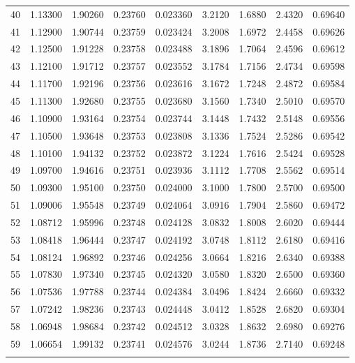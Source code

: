 \documentclass[letter,twosides,10pt]{article}
\begin{document}
\begin{longtable}{|c|c|c|c|c|c|c|c|c|}
 40 & 1.13300 & 1.90260 & 0.23760 & 0.023360 & 3.2120 & 1.6880 & 2.4320 & 0.69640 \\
 41 & 1.12900 & 1.90744 & 0.23759 & 0.023424 & 3.2008 & 1.6972 & 2.4458 & 0.69626 \\
 42 & 1.12500 & 1.91228 & 0.23758 & 0.023488 & 3.1896 & 1.7064 & 2.4596 & 0.69612 \\
 43 & 1.12100 & 1.91712 & 0.23757 & 0.023552 & 3.1784 & 1.7156 & 2.4734 & 0.69598 \\
 44 & 1.11700 & 1.92196 & 0.23756 & 0.023616 & 3.1672 & 1.7248 & 2.4872 & 0.69584 \\
 45 & 1.11300 & 1.92680 & 0.23755 & 0.023680 & 3.1560 & 1.7340 & 2.5010 & 0.69570 \\
 46 & 1.10900 & 1.93164 & 0.23754 & 0.023744 & 3.1448 & 1.7432 & 2.5148 & 0.69556 \\
 47 & 1.10500 & 1.93648 & 0.23753 & 0.023808 & 3.1336 & 1.7524 & 2.5286 & 0.69542 \\
 48 & 1.10100 & 1.94132 & 0.23752 & 0.023872 & 3.1224 & 1.7616 & 2.5424 & 0.69528 \\
 49 & 1.09700 & 1.94616 & 0.23751 & 0.023936 & 3.1112 & 1.7708 & 2.5562 & 0.69514 \\
 50 & 1.09300 & 1.95100 & 0.23750 & 0.024000 & 3.1000 & 1.7800 & 2.5700 & 0.69500 \\
 51 & 1.09006 & 1.95548 & 0.23749 & 0.024064 & 3.0916 & 1.7904 & 2.5860 & 0.69472 \\
 52 & 1.08712 & 1.95996 & 0.23748 & 0.024128 & 3.0832 & 1.8008 & 2.6020 & 0.69444 \\
 53 & 1.08418 & 1.96444 & 0.23747 & 0.024192 & 3.0748 & 1.8112 & 2.6180 & 0.69416 \\
 54 & 1.08124 & 1.96892 & 0.23746 & 0.024256 & 3.0664 & 1.8216 & 2.6340 & 0.69388 \\
 55 & 1.07830 & 1.97340 & 0.23745 & 0.024320 & 3.0580 & 1.8320 & 2.6500 & 0.69360 \\
 56 & 1.07536 & 1.97788 & 0.23744 & 0.024384 & 3.0496 & 1.8424 & 2.6660 & 0.69332 \\
 57 & 1.07242 & 1.98236 & 0.23743 & 0.024448 & 3.0412 & 1.8528 & 2.6820 & 0.69304 \\
 58 & 1.06948 & 1.98684 & 0.23742 & 0.024512 & 3.0328 & 1.8632 & 2.6980 & 0.69276 \\
 59 & 1.06654 & 1.99132 & 0.23741 & 0.024576 & 3.0244 & 1.8736 & 2.7140 & 0.69248 \\
 & & & & & & & & \\

\end{longtable}
\end{document}
